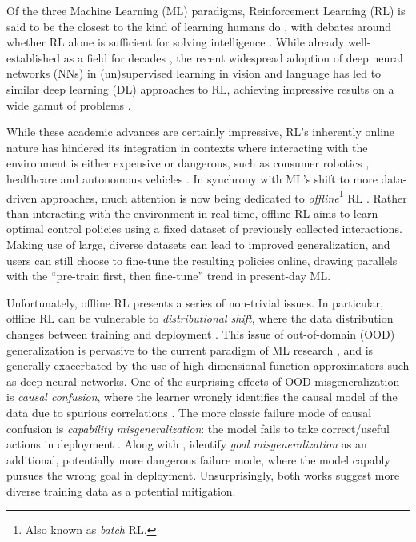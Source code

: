 \documentclass[../thesis-proposal/main.tex]{subfiles}
\begin{document}
Of the three Machine Learning (ML) paradigms, Reinforcement Learning (RL) is said to be the closest
to the kind of learning humans do \citep{sutton_reinforcement_2018}, with debates around whether RL
alone is sufficient for solving intelligence \citep{silver_reward_2021, vamplew_scalar_2022}. While
already well-established as a field for decades \citep{minsky_theory_1954, bellman_dynamic_1957,
klopf_brain_1972, bryson_optimal_1996}, the recent widespread adoption of deep neural networks (NNs)
in (un)supervised learning in vision \citep{krizhevsky_imagenet_2012, he_deep_2016,
mildenhall_nerf_2021} and language \citep{mikolov_distributed_2013, vaswani_attention_2017,
devlin_bert_2019, brown_language_2020} has led to similar deep learning (DL) approaches to RL,
achieving impressive results on a wide gamut of problems \citep{mnih_playing_2013,
silver_general_2018, openai_dota_2019, fawzi_discovering_2022}. 

While these academic advances are certainly impressive, RL's inherently online nature has hindered
its integration in contexts where interacting with the environment is either expensive or dangerous,
such as consumer robotics \citep{singh_reinforcement_2022}, healthcare
\citep{liu_reinforcement_2020} and autonomous vehicles \citep{kiran_deep_2022}. In synchrony with
ML's shift to more data-driven approaches, much attention is now being dedicated to
\textit{offline}\footnote{Also known as \textit{batch} RL.} RL \citep{levine_offline_2020,
prudencio_survey_2022}. Rather than interacting with the environment in real-time, offline RL aims
to learn optimal control policies using a fixed dataset of previously collected interactions. Making
use of large, diverse datasets can lead to improved generalization, and users can still choose to
fine-tune the resulting policies online, drawing parallels with the ``pre-train first, then
fine-tune'' trend in present-day ML.

Unfortunately, offline RL presents a series of non-trivial issues. In particular, offline RL can be
vulnerable to \textit{distributional shift}, where the data distribution changes between training
and deployment \citep{quinonero-candela_dataset_2008}. This issue of out-of-domain (OOD)
generalization \citep{shen_towards_2021} is pervasive to the current paradigm of ML research
\citep{arjovsky_out_2020}, and is generally exacerbated by the use of high-dimensional function
approximators such as deep neural networks. One of the surprising effects of OOD misgeneralization
is \textit{causal confusion}, where the learner wrongly identifies the causal model of the data due
to spurious correlations \citep{de_haan_causal_2019}. The more classic  failure mode of causal
confusion is \textit{capability misgeneralization}: the model fails to take correct/useful actions
in deployment \citep{gupta_can_2022, tien_study_2022}. Along with \citet{shah_goal_2022},
\citet{langosco_goal_2022} identify \textit{goal misgeneralization} as an additional, potentially
more dangerous failure mode, where the model capably pursues the wrong goal in deployment.
Unsurprisingly, both works suggest more diverse training data as a potential mitigation.
\end{document}
